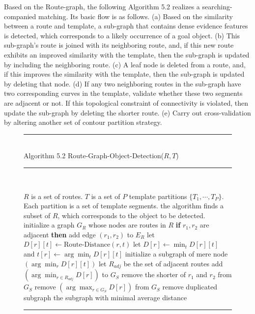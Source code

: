 \documentclass[journal]{IEEEtran}
\newenvironment{myalgorithm}[1]%
{\begin{figure}[!h]\small\noindent\rule{\linewidth}{1pt}\\#1\vspace{-0.5em}\\%
\rule{\linewidth}{0.5pt}\\\vspace{-1.5em}}%
{\vspace{-0.5em}\rule{\linewidth}{1pt}\end{figure}}
\begin{document}
Based on the Route-graph, the following Algorithm 5.2 realizes a searching-companied matching. 
Its basic flow is as follows. 
(a) Based on the similarity between a route and template, 
a sub-graph that contains dense evidence features is detected, 
which corresponds to a likely occurrence of a goal object. 
(b) This sub-graph's route is joined with its neighboring route, 
and, if this new route exhibits an improved similarity with the template, 
then the sub-graph is updated by including the neighboring route. 
(c) A leaf node is deleted from a route, 
and, if this improves the similarity with the template, 
then the sub-graph is updated by deleting that node. 
(d) If any two neighboring routes in the sub-graph have two corresponding curves in the template, 
validate whether these two segments are adjacent or not. 
If this topological constraint of connectivity is violated, 
then update the sub-graph by deleting the shorter route. 
(e) Carry out cross-validation by altering another set of contour partition strategy.

\begin{myalgorithm}{Algorithm 5.2 Route-Graph-Object-Detection($R,T$)}
\begin{algorithmic}[1]
\REQUIRE $R$ is a set of routes. $T$ is a set of $P$ template partitions
$\{T_1,\cdots,T_P\}$. Each partition is a set of template segments.
\ENSURE the algorithm finds a subset of $R$, which corresponds to the object to be detected.
\STATE initialize a graph $G_R$ whose nodes are routes in $R$
  \STATE \textbf{if} $r_1,r_2$ are adjacent \textbf{then} add edge $(r_1,r_2)$ to $E_R$
\ENDFOR
{}
    \STATE let $D[r][t]\leftarrow\text{Route-Distance}(r,t)$
  \ENDFOR
    \STATE let $D[r]\leftarrow\min_t D[r][t]$ and $t[r]\leftarrow\arg\min_t D[r][t]$
  \ENDFOR
    \STATE initialize a subgraph of mere node $(\arg\min_r D[r][t])$
  \ENDFOR
  \REPEAT
      \STATE let $R_{adj}$ be the set of adjacent routes
        \STATE add $(\arg\min_{r\in R_{adj}}D[r])$ to $G_S$
      \ENDIF
        \STATE remove the shorter of $r_1$ and $r_2$ from $G_S$
      \ENDIF
        \STATE remove $(\arg\max_{r\in G_S}D[r])$ from $G_S$
      \ENDIF
    \ENDFOR
    \STATE remove duplicated subgraph
\ENDFOR
\RETURN the subgraph with minimal average distance
\end{algorithmic}
\end{myalgorithm}
\end{document}
